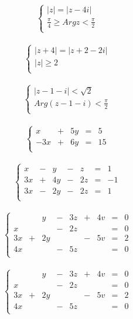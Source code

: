 \documentclass[a4paper]{article}
\begin{document}
$$ \begin{cases}
   |z| = |z-4i|\\
   \frac{\pi}{4} \geq Arg z < \frac{\pi}{2}\\
   \end{cases} 
$$\\
   
$$ \begin{cases}
   |z+4| = |z+2-2i|\\
   |z| \geq 2\\
   \end{cases} 
$$\\
   
$$ \begin{cases}
   |z-1-i| < \sqrt{2}\\
   Arg(z-1-i) < \frac{\pi}{2}\\
   \end{cases} 
$$\\

$$ \left\{ \begin{array}{rrrrr}
   x & + & 5y & = & 5\\
   -3x & + & 6y & = & 15\\
   \end{array}
\right.$$\\

$$ \left\{ \begin{array}{rrrrrrr}
   x & - & y & - & z & = & 1\\
   3x & + & 4y & - & 2z & = & -1\\
   3x & - & 2y & - & 2z & = & 1\\
   \end{array}
\right.$$\\


$$ \left\{ \begin{array}{rrrrrrrrr}
   \ & \ & y & - & 3z & + & 4v & = & 0\\
   x & \ & \ & - & 2z & \ & \ & = & 0\\
   3x & + & 2y & \ & \ & - & 5v & = & 2\\
   4x & \ & \ & - & 5z & \ & \ & = & 0\\ 
   \end{array}
\right.$$\\

$$ \left\{ \begin{array}{ccccccccc}
   \ & \ & y & - & 3z & + & 4v & = & 0\\
   x & \ & \ & - & 2z & \ & \ & = & 0\\
   3x & + & 2y & \ & \ & - & 5v & = & 2\\
   4x & \ & \ & - & 5z & \ & \ & = & 0\\ 
   \end{array}
\right.$$\\
\end{document}

